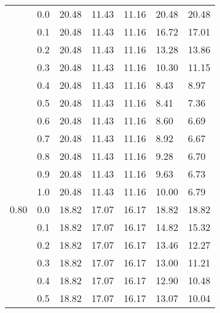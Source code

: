 \begin{longtable}{lp{2cm}|p{2cm}p{2cm}p{2cm}p{2cm}p{2cm}}
\bottomrule
\endlastfoot
0.70 & 0.0 &       20.48 &             11.43 &                11.16 &                20.48 &           20.48 \\
     & 0.1 &       20.48 &             11.43 &                11.16 &                16.72 &           17.01 \\
     & 0.2 &       20.48 &             11.43 &                11.16 &                13.28 &           13.86 \\
     & 0.3 &       20.48 &             11.43 &                11.16 &                10.30 &           11.15 \\
     & 0.4 &       20.48 &             11.43 &                11.16 &                 8.43 &            8.97 \\
     & 0.5 &       20.48 &             11.43 &                11.16 &                 8.41 &            7.36 \\
     & 0.6 &       20.48 &             11.43 &                11.16 &                 8.60 &            6.69 \\
     & 0.7 &       20.48 &             11.43 &                11.16 &                 8.92 &            6.67 \\
     & 0.8 &       20.48 &             11.43 &                11.16 &                 9.28 &            6.70 \\
     & 0.9 &       20.48 &             11.43 &                11.16 &                 9.63 &            6.73 \\
     & 1.0 &       20.48 &             11.43 &                11.16 &                10.00 &            6.79 \\
0.80 & 0.0 &       18.82 &             17.07 &                16.17 &                18.82 &           18.82 \\
     & 0.1 &       18.82 &             17.07 &                16.17 &                14.82 &           15.32 \\
     & 0.2 &       18.82 &             17.07 &                16.17 &                13.46 &           12.27 \\
     & 0.3 &       18.82 &             17.07 &                16.17 &                13.00 &           11.21 \\
     & 0.4 &       18.82 &             17.07 &                16.17 &                12.90 &           10.48 \\
     & 0.5 &       18.82 &             17.07 &                16.17 &                13.07 &           10.04 \\

\end{longtable}
